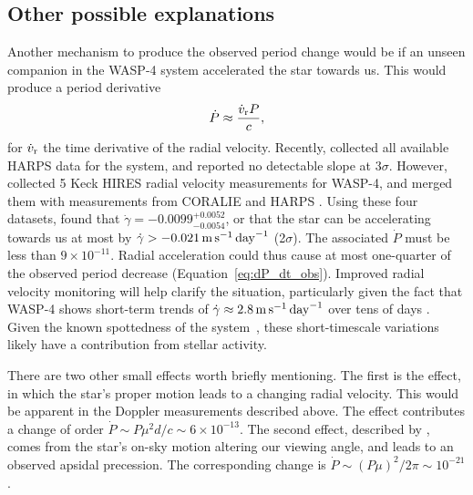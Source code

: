 \documentclass[12pt,twocolumn,tighten]{aastex62}
\begin{document}
\subsection{Other possible explanations}

Another mechanism to produce the observed period change would be if an
unseen companion in the WASP-4 system accelerated the star towards us.
This would produce a period derivative
\begin{equation}
	\dot{P} \approx \frac{\dot{v}_{\rm r} P}{c},
\end{equation}
for $\dot{v}_{\rm r}$ the time derivative of the radial velocity.
Recently, \citet{bonomo_gaps_2017} collected all available HARPS data
for the system, and reported no detectable slope at $3\sigma$.
However, \citet{knutson_friends_2014} collected 5 Keck HIRES radial
velocity measurements for WASP-4, and merged them with measurements
from CORALIE and HARPS \citep{wilson_wasp-4b_2008,pont_determining_2011,husnoo_observational_2012}.
Using these four datasets, \citet{knutson_friends_2014} found that
$\dot{\gamma} = -0.0099^{+0.0052}_{-0.0054}$, or that the
star can be accelerating towards us at most by $\dot{\gamma} > -
0.021 \,{\rm m}\,{\rm s}^{-1}\,{\rm day}^{-1}$ (2$\sigma$).
The associated $\dot{P}$
must be less than $9\times 10^{-11}$.  
Radial acceleration could thus cause at most one-quarter of
the observed period decrease (Equation~\ref{eq:dP_dt_obs}).
Improved radial velocity
monitoring will help clarify the situation,
particularly given the fact that WASP-4 shows short-term trends of
$\dot{\gamma} \approx 2.8 \,{\rm m}\,{\rm s}^{-1}\,{\rm day}^{-1}$ over
tens of days \citep{husnoo_observational_2012}.
Given the known spottedness
of the system~\citep{sanchis-ojeda_starspots_2011}, these
short-timescale variations likely have a contribution from stellar
activity.

There are two other small effects worth briefly mentioning.  The first
is the \citet{shklovskii_possible_1970} effect, in which the star's
proper motion leads to a changing radial velocity.  This would be
apparent in the Doppler measurements described above.  The effect
contributes a change of order $\dot{P} \sim P\mu^2 d/ c \sim
6\times10^{-13}$.  The second effect, described by
\citet{rafikov_stellar_2009}, comes from the star's on-sky motion
altering our viewing angle, and leads to an observed apsidal
precession.  The corresponding change is $\dot{P} \sim (P\mu)^2/2\pi
\sim 10^{-21}$.
\end{document}
